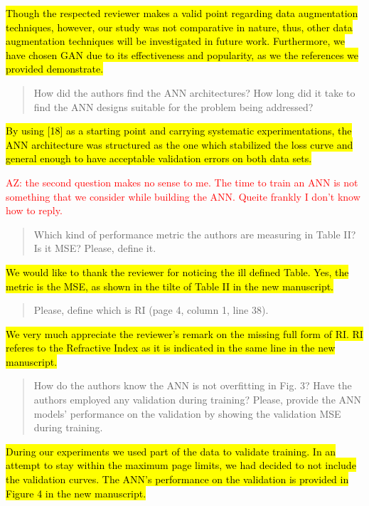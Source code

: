 \documentclass{article}
\begin{document}
	\hl{Though the respected reviewer makes a valid point regarding data augmentation techniques, however, our study was not comparative in nature, thus, other data augmentation techniques will be investigated in future work. Furthermore, we have chosen GAN due to its effectiveness and popularity, as we the references we provided demonstrate.}
	
	\begin{quote}
	How did the authors find the ANN architectures? How long did it take to find the ANN designs suitable for the problem being addressed?
	\end{quote}
	
	\hl{By using [18] as a starting point and carrying systematic experimentations, the ANN architecture was structured as the one which stabilized the loss curve and general enough to have acceptable validation errors on both data sets.}
	
	\textcolor{red}{AZ: the second question makes no sense to me. The time to train an ANN is not something that we consider while building the ANN. Queite frankly I don't know how to reply.}
	
	\begin{quote}
	Which kind of performance metric the authors are measuring in Table II? Is it MSE? Please, define it.
	\end{quote}
	
	\hl{We would like to thank the reviewer for noticing the ill defined Table. Yes, the metric is the MSE, as shown in the tilte of Table II in the new manuscript.}
	
	\begin{quote}
	Please, define which is RI (page 4, column 1, line 38).
	\end{quote}
	
	\hl{We very much appreciate the reviewer's remark on the missing full form of RI. RI referes to the Refractive Index as it is indicated in the same line in the new manuscript. }	
	
	
	\begin{quote}
	How do the authors know the ANN is not overfitting in Fig. 3? Have the authors employed any validation during training? Please, provide the ANN models' performance on the validation by showing the validation MSE during training.
	\end{quote}
	
	\hl{During our experiments we used part of the data to validate training. In an attempt to stay within the maximum page limits, we had decided to not include the validation curves.
	 The ANN's performance on the validation is provided in Figure 4 in the new manuscript.}
	
\end{document}
